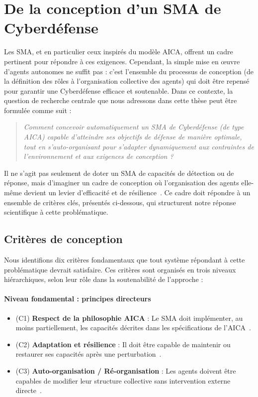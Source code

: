 \section{De la conception d'un SMA de Cyberdéfense}\label{sec:problematique-sma}

Les \ac{SMA}, et en particulier ceux inspirés du modèle \ac{AICA}, offrent un cadre pertinent pour répondre à ces exigences. Cependant, la simple mise en œuvre d'agents autonomes ne suffit pas : c'est l'ensemble du processus de conception (de la définition des rôles à l'organisation collective des agents) qui doit être repensé pour garantir une Cyberdéfense efficace et soutenable.
Dans ce contexte, la question de recherche centrale que nous adressons dans cette thèse peut être formulée comme suit :

\begin{quote}
    \emph{Comment concevoir automatiquement un \ac{SMA} de Cyberdéfense (de type \ac{AICA}) capable d'atteindre ses objectifs de défense de manière optimale, tout en s'auto-organisant pour s'adapter dynamiquement aux contraintes de l'environnement et aux exigences de conception ?}
\end{quote}

Il ne s'agit pas seulement de doter un \ac{SMA} de capacités de détection ou de réponse, mais d'imaginer un cadre de conception où l'organisation des agents elle-même devient un levier d'efficacité et de résilience~\cite{Picard2006, DiMarzoSerugendo2006}. Ce cadre doit répondre à un ensemble de critères clés, présentés ci-dessous, qui structurent notre réponse scientifique à cette problématique.

\subsection*{Critères de conception}

Nous identifions dix critères fondamentaux que tout système répondant à cette problématique devrait satisfaire. Ces critères sont organisés en trois niveaux hiérarchiques, selon leur rôle dans la soutenabilité de l'approche :

\paragraph{Niveau fondamental : principes directeurs}
\begin{itemize}
    \item (C1) \textbf{Respect de la philosophie \ac{AICA}} : Le \ac{SMA} doit implémenter, au moins partiellement, les capacités décrites dans les spécifications de l'\ac{AICA}~\cite{Kott2023}.
    \item (C2) \textbf{Adaptation et résilience} : Il doit être capable de maintenir ou restaurer ses capacités après une perturbation~\cite{Bodeau2011}.
    \item (C3) \textbf{Auto-organisation / Ré-organisation} : Les agents doivent être capables de modifier leur structure collective sans intervention externe directe~\cite{DiMarzoSerugendo2006}.
\end{itemize}

